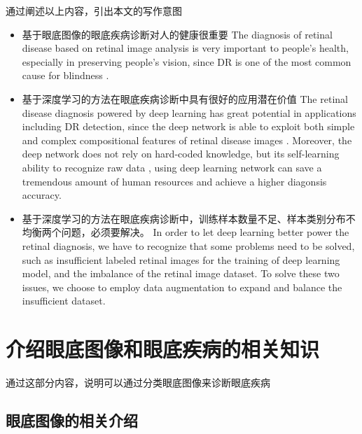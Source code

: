 \documentclass{ijisa}
\begin{document}
通过阐述以上内容，引出本文的写作意图

\begin{itemize}
    \item 基于眼底图像的眼底疾病诊断对人的健康很重要
    The diagnosis of retinal disease based on retinal image analysis is very important to people's health, especially in preserving people's vision, since DR is one of the most common cause for blindness \cite{zhang2016active}.
    \item 基于深度学习的方法在眼底疾病诊断中具有很好的应用潜在价值
    The retinal disease diagnosis powered by deep learning has great potential in applications including DR detection, since the deep network is able to exploit both simple and complex compositional features of retinal disease images \cite{badar2020application}. Moreover, the deep network does not rely on hard-coded knowledge, but its self-learning ability to recognize raw data \cite{badar2020application}, using deep learning network can save a tremendous amount of human resources and achieve a higher diagonsis accuracy.
    \item 基于深度学习的方法在眼底疾病诊断中，训练样本数量不足、样本类别分布不均衡两个问题，必须要解决。
    In order to let deep learning better power the retinal diagnosis, we have to recognize that some problems need to be solved, such as insufficient labeled retinal images for the training of deep learning model, and the imbalance of the retinal image dataset. To solve these two issues, we choose to employ data augmentation to expand and balance the insufficient dataset.
\end{itemize}

\section{介绍眼底图像和眼底疾病的相关知识}

通过这部分内容，说明可以通过分类眼底图像来诊断眼底疾病

\subsection{眼底图像的相关介绍}
\end{document}
